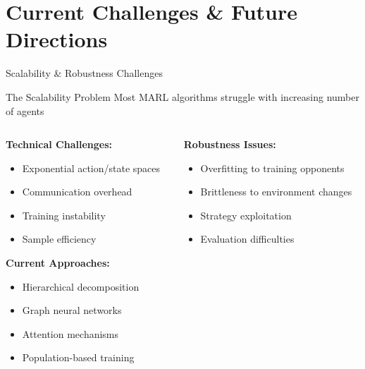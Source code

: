 \documentclass[aspectratio=169]{beamer}
\begin{document}
\section{Current Challenges \& Future Directions}

\begin{frame}{Scalability \& Robustness Challenges}
    
    \begin{block}{The Scalability Problem}
        Most MARL algorithms struggle with increasing number of agents
    \end{block}
    
    \vfill
    
    \begin{columns}
        \begin{column}{0.5\textwidth}
            \textbf{Technical Challenges:}
            \begin{itemize}
                \item Exponential action/state spaces
                \item Communication overhead  
                \item Training instability
                \item Sample efficiency \autocite{liu_scaling_2024}
            \end{itemize}
            
            \vfill
            \textbf{Current Approaches:}
            \begin{itemize}
                \item Hierarchical decomposition
                \item Graph neural networks
                \item Attention mechanisms
                \item Population-based training
            \end{itemize}
        \end{column}
        \begin{column}{0.5\textwidth}
            \textbf{Robustness Issues:}
            \begin{itemize}
                \item Overfitting to training opponents
                \item Brittleness to environment changes
                \item Strategy exploitation
                \item Evaluation difficulties
            \end{itemize}
            

\end{column}
\end{columns}
\end{frame}
\end{document}
